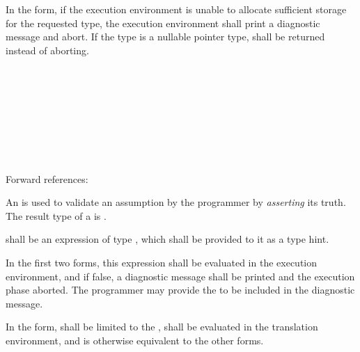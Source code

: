 \specsubsubitem
In the  form, if the execution environment is unable to
allocate sufficient storage for the requested type, the execution environment
shall print a diagnostic message and abort. If the type is a nullable pointer
type,  shall be returned instead of aborting.


\begin{grammar}
 \\
	 \terminal{(}  \terminal{)} \\
	 \terminal{(}  \terminal{,}  \terminal{)} \\
	  \terminal{(}  \terminal{)} \\
	  \terminal{(}  \terminal{,}  \terminal{)} \\
	 \terminal{(}  \terminal{)} \\
	  \terminal{(}  \terminal{)} \\
\end{grammar}

Forward references: 

\specsubsubitem
An  is used to validate an assumption by the
programmer by \textit{asserting} its truth. The result type of a
 is .

\specsubsubitem
{} shall be an expression of type , which
shall be provided to it as a type hint.

\specsubsubitem
In the first two forms, this expression shall be evaluated
in the execution environment, and if false, a diagnostic message shall be
printed and the execution phase aborted. The programmer may provide the
 to be included in the diagnostic message.

\specsubsubitem
In the  form,  shall be limited to the
, shall be evaluated in the
translation environment, and is otherwise equivalent to the other forms.

